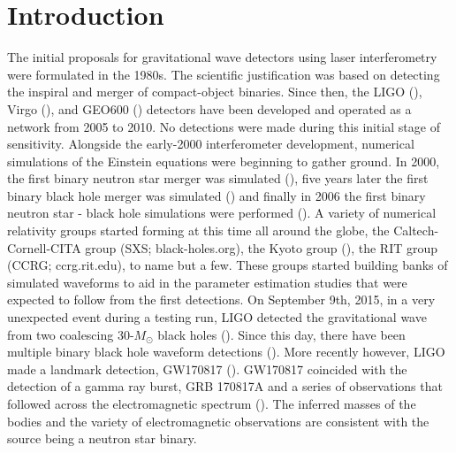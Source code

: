 
\chapter{Introduction}
\label{chap:intro}

The initial proposals for gravitational wave detectors using laser interferometry were
formulated in the 1980s. The scientific justification was based on detecting the inspiral and merger of compact-object binaries. Since then, the LIGO (\cite{ligo2018gwtc}), Virgo (\cite{acernese2015advanced}), and GEO600 (\cite{affeldt2014advanced}) detectors have been developed and operated as a network from 2005 to 2010. No detections were made during this initial stage of sensitivity. Alongside the early-2000 interferometer development, numerical simulations of the Einstein equations were beginning to gather ground. In 2000, the first binary neutron star merger was simulated (\cite{shibata2000simulation}), five years later the first binary black hole merger was simulated (\cite{pretorius2005a}) and finally in 2006 the first binary neutron star - black hole simulations were performed (\cite{shibata2011coalescence}). A variety of numerical relativity groups started forming at this time all around the globe, the Caltech-Cornell-CITA group (SXS; black-holes.org),
the Kyoto group (\cite{nagakura:2014hza}), the RIT group (CCRG; ccrg.rit.edu), to name but a few. These groups started building banks of simulated waveforms to aid in the parameter estimation studies that were expected to follow from the first detections. On September 9th, 2015, in a very unexpected event during a testing run, LIGO detected the gravitational wave from two coalescing 30-$M_\odot$ black holes (\cite{theligoscientific:2016wfe}). Since this day, there have been multiple binary black hole waveform detections (\cite{ligo2018gwtc}). More recently however, LIGO made a landmark detection, GW170817 (\cite{abbott2017gw170817}). GW170817
coincided with the detection of a gamma ray burst, GRB 170817A and a series of observations that followed across the electromagnetic spectrum (\cite{villar:2017wcc}). The inferred masses of the bodies and the variety of electromagnetic observations are consistent with the source being a neutron star binary.

